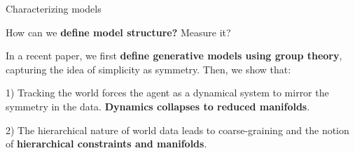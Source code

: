  
\begin{frame}[label=st] {Characterizing models}
    
     How can we \textbf{define model structure?} Measure it? \vfill
     
     In a recent paper\cite{ruffiniStructuredDynamicsAlgorithmic2023}, we first \textbf{define generative models using group theory}, capturing the idea of simplicity as symmetry. Then, we show that:
    \vfill
   
    
    
    1) Tracking the world forces the agent as a dynamical system to mirror the symmetry in the data.\textbf{ Dynamics collapses to reduced manifolds}. \vfill
    
    2) The hierarchical nature of world data leads to coarse-graining and the notion of \textbf{hierarchical constraints and manifolds}.\vfill
    
\end{frame}


  
  
  
   
